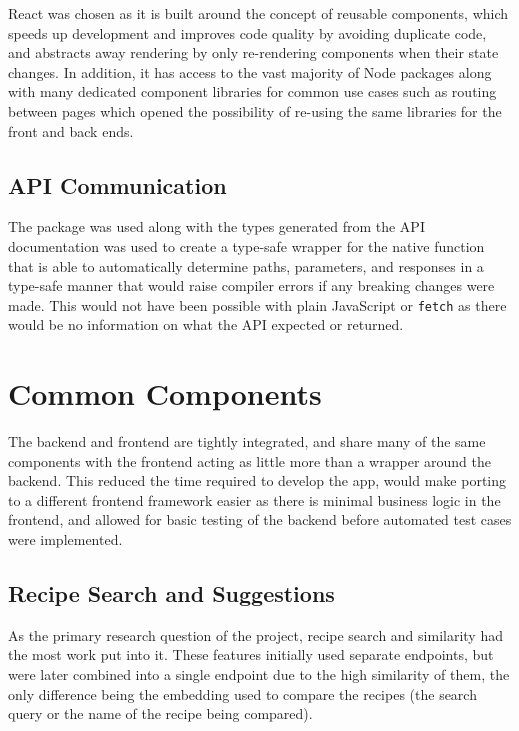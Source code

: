 React was chosen as it is built around the concept of reusable components, which speeds up development and
improves code quality by avoiding duplicate code,~\cite{hordijk_harmfulness_2009} and abstracts away rendering
by only re-rendering components when their state changes. In addition, it has access to the vast majority of
Node packages along with many dedicated component libraries for common use cases such as routing between pages
which opened the possibility of re-using the same libraries for the front and back ends.~\cite{saks_javascript_2019}

\subsection{API Communication}
The  package was used along with the types generated from the API documentation was
used to create a type-safe wrapper for the native  function that is able to automatically
determine paths, parameters, and responses in a type-safe manner that would raise compiler errors if any breaking
changes were made. This would not have been possible with plain JavaScript or \texttt{fetch} as there would be no
information on what the API expected or returned.

\section{Common Components}

The backend and frontend are tightly integrated, and share many of the same components with the frontend acting
as little more than a wrapper around the backend. This reduced the time required to develop the app, would
make porting to a different frontend framework easier as there is minimal business logic in the frontend, and
allowed for basic testing of the backend before automated test cases were implemented.

\subsection{Recipe Search and Suggestions}
As the primary research question of the project, recipe search and similarity had the most work put into it.
These features initially used separate endpoints, but were later combined into a single endpoint due to the
high similarity of them, the only difference being the embedding used to compare the recipes (the search query
or the name of the recipe being compared).

